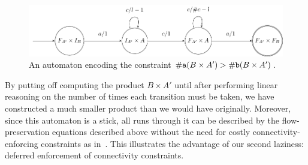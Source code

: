 \begin{figure}[h]
    \centering 
    \includegraphics[scale=\autscale]{ab}
  \caption{An automaton encoding the constraint $\#\text{\texttt{a}}(B \times A') > \#\text{\texttt{b}}(B \times A')$.}\label{fig:product}
\end{figure}

By putting off computing the product $B \times A'$ until after performing linear reasoning on the number of times each transition must be taken, we have constructed a much smaller product than we would have originally. Moreover, since this automaton is a stick, all runs through it can be described by the flow-preservation equations described above without the need for costly connectivity-enforcing constraints as in~\cite{generate-parikh-image}. This illustrates the advantage of our second laziness: deferred enforcement of connectivity constraints.